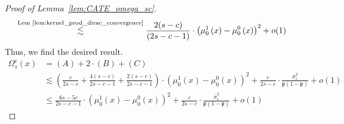 \begin{proof}[Proof of Lemma~\ref{lem:CATE_omega_sc}]
\begin{equation}
\begin{aligned}
            & \overset{\text{Lem \ref{lem:kernel_prod_dirac_convergence}}}{\lesssim} 
            \frac{2(s-c)}{(2s-c-1)} \cdot \left(\mu_{0}^{1}\left(x\right) - \mu_{0}^{0}\left(x\right)\right)^2 + o(1)
		\end{aligned}
	\end{equation}
	Thus, we find the desired result.
	\begin{equation}
		\begin{aligned}
			\Omega_{s}^{c}\left(x\right)
			& = (A) + 2\cdot (B) + (C) \\
			& \lesssim 
            \left(\frac{c}{2s-c} + \frac{4(s-c)}{2s-c-1} + \frac{2(s-c)}{2s-c-1}\right) \cdot \left(\mu_{0}^{1}\left(x\right) - \mu_{0}^{0}\left(x\right)\right)^2
            + \frac{c}{2s-c} \cdot \frac{\overline{\sigma}^2_{\varepsilon}}{\mathfrak{p}\left(1 - \mathfrak{p}\right)}
            + o(1) \\
            & \leq \frac{6s-5c}{2s-c-1} \cdot \left(\mu_{0}^{1}\left(x\right) - \mu_{0}^{0}\left(x\right)\right)^2
            + \frac{c}{2s-c} \cdot \frac{\overline{\sigma}^2_{\varepsilon}}{\mathfrak{p}\left(1 - \mathfrak{p}\right)}
            + o(1) 
		\end{aligned}
	\end{equation}
\end{proof}

